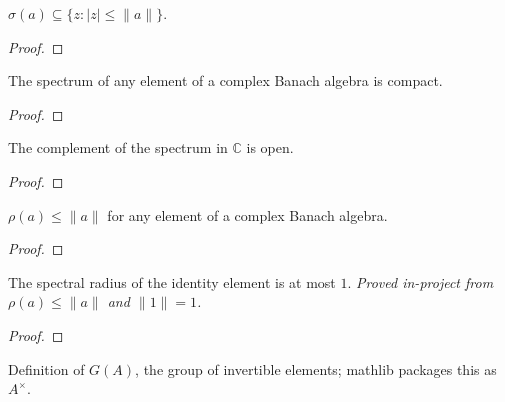 \begin{theorem}
  \label{thm:spectrum-in-closed-ball}
  \leanok
  $\sigma(a) \subseteq \{z : |z| \le \|a\|\}$.
\end{theorem}
\begin{proof}
  \leanok
\end{proof}

\begin{theorem}
  \label{thm:spectrum-compact}
  \leanok
  The spectrum of any element of a complex Banach algebra is compact.
\end{theorem}
\begin{proof}
  \leanok
\end{proof}

\begin{theorem}
  \label{thm:resolventSet-open}
  \leanok
  The complement of the spectrum in $\mathbb{C}$ is open.
\end{theorem}
\begin{proof}
  \leanok
\end{proof}

\begin{theorem}
  \label{thm:spectralRadius-le-norm}
  \leanok
  $\rho(a) \le \|a\|$ for any element of a complex Banach algebra.
\end{theorem}
\begin{proof}
  \leanok
\end{proof}

\begin{theorem}
  \label{thm:spectralRadius-one-le}
  \leanok
  The spectral radius of the identity element is at most $1$.
  \emph{Proved in-project from $\rho(a) \le \|a\|$ and $\|1\| = 1$.}
\end{theorem}
\begin{proof}
  \leanok
\end{proof}


\begin{theorem}
  \label{thm:units-def}
  \leanok
  Definition of $G(A)$, the group of invertible elements; mathlib
  packages this as $A^\times$.
\end{theorem}

